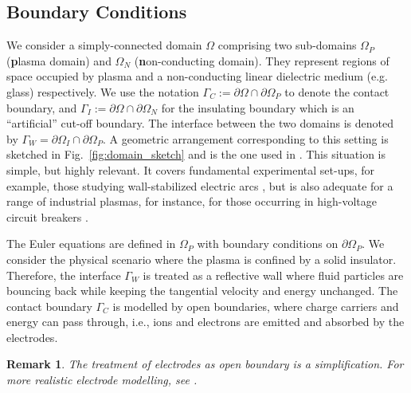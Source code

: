 \documentclass{article}
\newtheorem*{remark}{Remark}
\begin{document}
\subsection{Boundary Conditions} \label{sec:BC}

We consider a simply-connected domain $\Omega$ comprising two sub-domains $\Omega_P$
(\textbf{p}lasma domain) and $\Omega_N$ (\textbf{n}on-conducting domain). They represent
regions of space occupied by plasma and a non-conducting linear dielectric medium
(e.g. glass) respectively. We use the notation
$\Gamma_C := \partial\Omega \cap \partial\Omega_P$ to denote the contact boundary, and
$\Gamma_I := \partial\Omega \cap \partial\Omega_N$ for the insulating boundary which is an
``artificial'' cut-off boundary. The interface between the two domains is denoted by
$\Gamma_W = \partial\Omega_I \cap \partial\Omega_P$. A geometric arrangement corresponding
to this setting is sketched in Fig.~\ref{fig:domain_sketch} and is the one used in
\cite[][Ch. 1, Sec. 4]{fuchs_2021}. This situation is simple, but highly relevant. It
covers fundamental experimental set-ups, for example, those studying wall-stabilized
electric arcs \cite{GGF05}, but is also adequate for a range of industrial plasmas, for
instance, for those occurring in high-voltage circuit breakers \cite{SEE15,MGU20}.

The Euler equations are defined in $\Omega_P$ with boundary conditions on
$\partial\Omega_P$. We consider the physical scenario where the plasma is confined by a
solid insulator. Therefore, the interface $\Gamma_W$ is treated as a reflective wall where
fluid particles are bouncing back while keeping the tangential velocity and energy
unchanged. The contact boundary $\Gamma_C$ is modelled by open boundaries, where charge
carriers and energy can pass through, i.e., ions and electrons are emitted and absorbed by
the electrodes.

\begin{remark}
  The treatment of electrodes as open boundary is a simplification. For more realistic
  electrode modelling, see \cite{godyak_1990, parker_1993}.
\end{remark}
\end{document}
